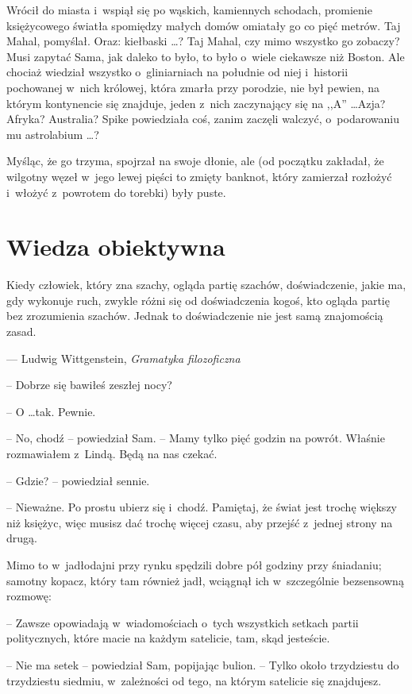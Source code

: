 \documentclass[oneside,polish,11pt,rmheadings]{mwbk}
\begin{document}
Wrócił do miasta i~wspiął się po wąskich, kamiennych schodach, promienie księżycowego światła spomiędzy małych domów omiatały go co pięć metrów. Taj Mahal, pomyślał. Oraz: kiełbaski \ldots  ? Taj Mahal, czy mimo wszystko go zobaczy? Musi zapytać Sama, jak daleko to było, to było o~wiele ciekawsze niż Boston. Ale chociaż wiedział wszystko o~gliniarniach na południe od niej i~historii pochowanej w~nich królowej, która zmarła przy porodzie, nie był pewien, na którym kontynencie się znajduje, jeden z~nich zaczynający się na ,,A'' \ldots   Azja? Afryka? Australia? Spike powiedziała coś, zanim zaczęli walczyć, o~podarowaniu mu astrolabium \ldots ? 

Myśląc, że go trzyma, spojrzał na swoje dłonie, ale (od początku zakładał, że wilgotny węzeł w~jego lewej pięści to zmięty banknot, który zamierzał rozłożyć i~włożyć z~powrotem do torebki) były puste. 

\chapter{Wiedza obiektywna}

Kiedy człowiek, który zna szachy, ogląda partię szachów, doświadczenie, jakie ma, gdy wykonuje ruch, zwykle różni się od doświadczenia kogoś, kto ogląda partię bez zrozumienia szachów. Jednak to doświadczenie nie jest samą znajomością zasad. 

\smallskip
\noindent --- Ludwig Wittgenstein, \textit{Gramatyka filozoficzna }

\bigskip
-- Dobrze się bawiłeś zeszłej nocy? 

-- O \ldots  tak. Pewnie. 

-- No, chodź -- powiedział Sam.  -- Mamy tylko pięć godzin na powrót. Właśnie rozmawiałem z~Lindą. Będą na nas czekać. 

-- Gdzie? -- powiedział sennie. 

-- Nieważne. Po prostu ubierz się i~chodź. Pamiętaj, że świat jest trochę większy niż księżyc, więc musisz dać trochę więcej czasu, aby przejść z~jednej strony na drugą. 

Mimo to w~jadłodajni przy rynku spędzili dobre pół godziny przy śniadaniu; samotny kopacz, który tam również jadł, wciągnął ich w~szczególnie bezsensowną rozmowę: 

-- Zawsze opowiadają w~wiadomościach o~tych wszystkich setkach partii politycznych, które macie na każdym satelicie, tam, skąd jesteście. 

-- Nie ma setek -- powiedział Sam, popijając bulion. -- Tylko około trzydziestu do trzydziestu siedmiu, w~zależności od tego, na którym satelicie się znajdujesz. 
\end{document}
